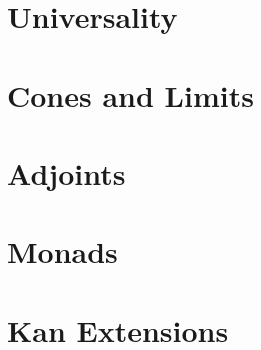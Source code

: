 \documentclass[12pt]{report}
\begin{document}
\chapter{Universality}


\chapter{Cones and Limits}



\chapter{Adjoints}


\chapter{Monads}



\chapter{Kan Extensions}



\begin{appendices}

\end{appendices}
\end{document}
